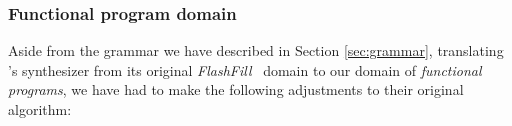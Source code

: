 \documentclass{article} %
\begin{document}





\subsubsection{Functional program domain} \label{sec:fp}

Aside from the grammar we have described in Section \ref{sec:grammar},
translating \citet{nsps}'s synthesizer from its original \emph{FlashFill}~\citep{prose} domain to our domain of \emph{functional programs},
we have had to make the following adjustments to their original algorithm:
\end{document}
